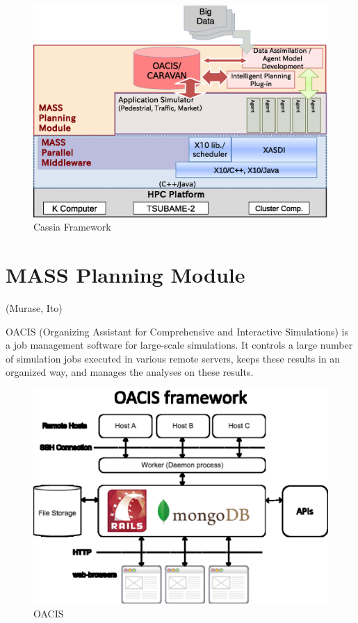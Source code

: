 \begin{figure}
  \centering
  \includegraphics[width=.8\linewidth]{Figs.noda/figure-01.framework.eps}
  \caption{Cassia Framework}
  \label{fig:Figs.noda/figure-01.framework.eps}
\end{figure}


\section{MASS Planning Module}
\label{s:MASS Planning Module}
(Murase, Ito)

OACIS (Organizing Assistant for Comprehensive and Interactive
Simulations) is a job management software for large-scale
simulations. It controls a large number of simulation jobs executed in
various remote servers, keeps these results in an organized way, and
manages the analyses on these results.

\begin{figure}
  \centering
  \includegraphics[width=.8\linewidth]{Figs.noda/figure-02.oacis.eps}
  \caption{OACIS}
  \label{fig:Figs.noda/figure-02.oacis.eps}
\end{figure}

